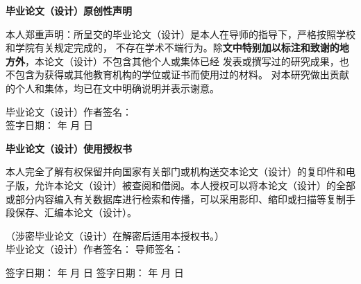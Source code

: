 
\begin{center}
    \bfseries {} 毕业论文（设计）原创性声明
\end{center}

{
    本人郑重声明：所呈交的毕业论文（设计）是本人在导师的指导下，严格按照学校和学院有关规定完成的，
    不存在学术不端行为。除\textbf{文中特别加以标注和致谢的地方外}，本论文（设计）不包含其他个人或集体已经
    发表或撰写过的研究成果，也不包含为获得或其他教育机构的学位或证书而使用过的材料。
    对本研究做出贡献的个人和集体，均已在文中明确说明并表示谢意。

    \begin{flushright}
        毕业论文（设计）作者签名：\makebox[7.7em]{}\\
        签字日期：\hspace{1.4em} 年 \hspace{1em} 月 \hspace{1em} 日
    \end{flushright}
}
    \mbox{} \vfill

\begin{center}
        \bfseries {} 毕业论文（设计）使用授权书
\end{center}

{
    本人完全了解有权保留并向国家有关部门或机构送交本论文（设计）的复印件和电子版，允许本论文（设计）被查阅和借阅。本人授权可以将本论文（设计）的全部或部分内容编入有关数据库进行检索和传播，可以采用影印、缩印或扫描等复制手段保存、汇编本论文（设计）。

    （涉密毕业论文（设计）在解密后适用本授权书。）\\

    \noindent
    毕业论文（设计）作者签名：\makebox[3.5cm]{}
    导师签名：\makebox[3.5cm]{}

    \vspace{0.8em}

    \noindent
    签字日期：\hspace{1.4em} 年 \hspace{1em} 月 \hspace{1em} 日
    \hfill
    签字日期：\hspace{1.4em} 年 \hspace{1em} 月 \hspace{1em} 日
}
